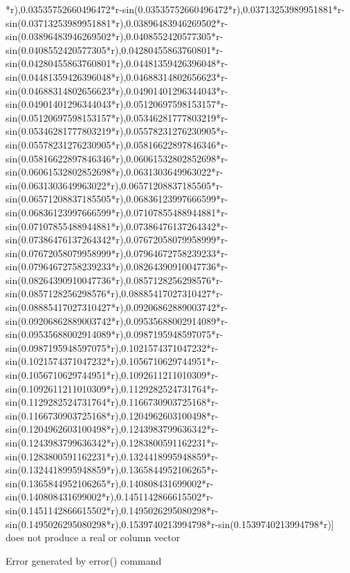 \documentclass[a4paper,10pt]{article}
\begin{document}
\begin{eulernotebook}
\begin{eulercomment}
\begin{eulercomment}
\begin{eulercomment}
\begin{eulercomment}
\begin{eulercomment}
\begin{eulercomment}
\begin{eulercomment}
\begin{eulercomment}
\begin{eulercomment}
\begin{eulercomment}
\begin{eulercomment}
\begin{eulercomment}
\begin{eulercomment}
\begin{eulercomment}
\begin{eulercomment}
\begin{eulercomment}
\begin{euleroutput}
*r),0.03535752660496472*r-sin(0.03535752660496472*r),0.03713253989951881*r-sin(0.03713253989951881*r),0.03896483946269502*r-sin(0.03896483946269502*r),0.0408552420577305*r-sin(0.0408552420577305*r),0.04280455863760801*r-sin(0.04280455863760801*r),0.04481359426396048*r-sin(0.04481359426396048*r),0.04688314802656623*r-sin(0.04688314802656623*r),0.04901401296344043*r-sin(0.04901401296344043*r),0.05120697598153157*r-sin(0.05120697598153157*r),0.05346281777803219*r-sin(0.05346281777803219*r),0.05578231276230905*r-sin(0.05578231276230905*r),0.05816622897846346*r-sin(0.05816622897846346*r),0.06061532802852698*r-sin(0.06061532802852698*r),0.0631303649963022*r-sin(0.0631303649963022*r),0.06571208837185505*r-sin(0.06571208837185505*r),0.06836123997666599*r-sin(0.06836123997666599*r),0.07107855488944881*r-sin(0.07107855488944881*r),0.07386476137264342*r-sin(0.07386476137264342*r),0.07672058079958999*r-sin(0.07672058079958999*r),0.07964672758239233*r-sin(0.07964672758239233*r),0.08264390910047736*r-sin(0.08264390910047736*r),0.0857128256298576*r-sin(0.0857128256298576*r),0.08885417027310427*r-sin(0.08885417027310427*r),0.09206862889003742*r-sin(0.09206862889003742*r),0.09535688002914089*r-sin(0.09535688002914089*r),0.0987195948597075*r-sin(0.0987195948597075*r),0.1021574371047232*r-sin(0.1021574371047232*r),0.1056710629744951*r-sin(0.1056710629744951*r),0.1092611211010309*r-sin(0.1092611211010309*r),0.1129282524731764*r-sin(0.1129282524731764*r),0.1166730903725168*r-sin(0.1166730903725168*r),0.1204962603100498*r-sin(0.1204962603100498*r),0.1243983799636342*r-sin(0.1243983799636342*r),0.1283800591162231*r-sin(0.1283800591162231*r),0.1324418995948859*r-sin(0.1324418995948859*r),0.1365844952106265*r-sin(0.1365844952106265*r),0.140808431699002*r-sin(0.140808431699002*r),0.1451142866615502*r-sin(0.1451142866615502*r),0.1495026295080298*r-sin(0.1495026295080298*r),0.1539740213994798*r-sin(0.1539740213994798*r)] does not produce a real or column vector
  
  Error generated by error() command
  

\end{euleroutput}
\end{eulercomment}
\end{eulercomment}
\end{eulercomment}
\end{eulercomment}
\end{eulercomment}
\end{eulercomment}
\end{eulercomment}
\end{eulercomment}
\end{eulercomment}
\end{eulercomment}
\end{eulercomment}
\end{eulercomment}
\end{eulercomment}
\end{eulercomment}
\end{eulercomment}
\end{eulercomment}
\end{eulernotebook}
\end{document}
